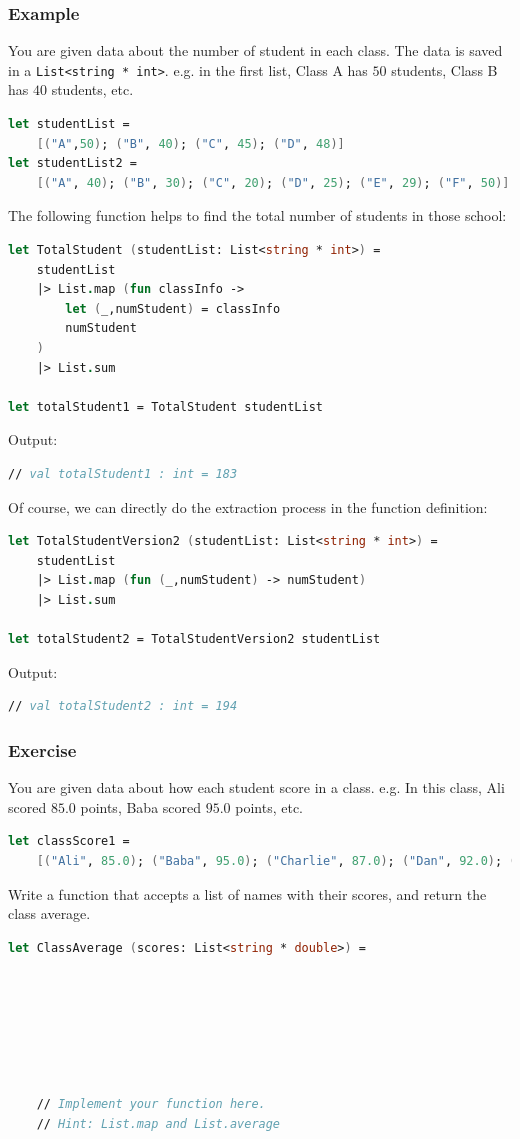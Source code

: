 \documentclass[12pt]{article}
\begin{document}
\subsubsection*{Example}
You are given data about the number of student in each class. The data is saved in a \texttt{List<string * int>}. e.g. in the first list, Class A has $50$ students, Class B has $40$ students, etc.
\begin{lstlisting}[language=FSharp]
let studentList =
    [("A",50); ("B", 40); ("C", 45); ("D", 48)]
let studentList2 = 
    [("A", 40); ("B", 30); ("C", 20); ("D", 25); ("E", 29); ("F", 50)]
\end{lstlisting}
The following function helps to find the total number of students in those school:
\begin{lstlisting}[language=FSharp]
let TotalStudent (studentList: List<string * int>) =
    studentList
    |> List.map (fun classInfo ->
        let (_,numStudent) = classInfo
        numStudent
    )
    |> List.sum

let totalStudent1 = TotalStudent studentList
\end{lstlisting}
Output:
\begin{lstlisting}[language=FSharp]
// val totalStudent1 : int = 183
\end{lstlisting}
Of course, we can directly do the extraction process in the function definition:

\begin{lstlisting}[language=FSharp]
let TotalStudentVersion2 (studentList: List<string * int>) =
    studentList
    |> List.map (fun (_,numStudent) -> numStudent)
    |> List.sum

let totalStudent2 = TotalStudentVersion2 studentList
\end{lstlisting}

Output:
\begin{lstlisting}[language=FSharp]
// val totalStudent2 : int = 194
\end{lstlisting}
\pagebreak
\subsubsection*{Exercise}
You are given data about how each student score in a class. e.g. In this class, Ali scored $85.0$ points, Baba scored $95.0$ points, etc.

\begin{lstlisting}[language=FSharp]
let classScore1 =
    [("Ali", 85.0); ("Baba", 95.0); ("Charlie", 87.0); ("Dan", 92.0); ("Emily", 96.0); ("Fiona", 92.0)]
\end{lstlisting}
Write a function that accepts a list of names with their scores, and return the class average. 
\begin{lstlisting}[language=FSharp]
let ClassAverage (scores: List<string * double>) =







    // Implement your function here.
    // Hint: List.map and List.average
\end{lstlisting}
\end{document}

